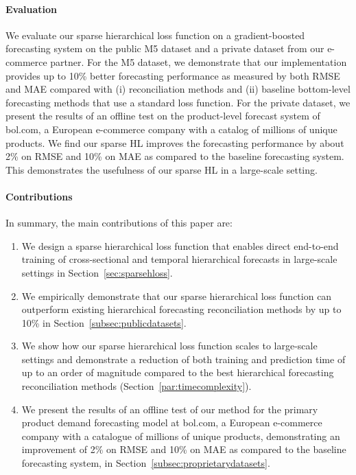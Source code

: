 \documentclass[preprint, 3p, times, twocolumn]{elsarticle}
\begin{document}
\paragraph{Evaluation} We evaluate our sparse hierarchical loss function on a gradient-boosted forecasting system on the public M5 dataset \cite{makridakis_m5_2022} and a private dataset from our e-commerce partner. For the M5 dataset, we demonstrate that our implementation provides up to 10\% better forecasting performance as measured by both RMSE and MAE compared with (i) reconciliation methods and (ii) baseline bottom-level forecasting methods that use a standard loss function. For the private dataset, we present the results of an offline test on the product-level forecast system of bol.com, a European e-commerce company with a catalog of millions of unique products. We find our sparse HL improves the forecasting performance by about 2\% on RMSE and 10\% on MAE as compared to the baseline forecasting system. This demonstrates the usefulness of our sparse HL in a large-scale setting.

\paragraph{Contributions} In summary, the main contributions of this paper are:
\begin{enumerate}
  \item We design a sparse hierarchical loss function that enables direct end-to-end training of cross-sectional and temporal hierarchical forecasts in large-scale settings in Section~\ref{sec:sparsehloss}.
  \item We empirically demonstrate that our sparse hierarchical loss function can outperform existing hierarchical forecasting reconciliation methods by up to 10\% in Section~\ref{subsec:publicdatasets}.
  \item We show how our sparse hierarchical loss function scales to large-scale settings and demonstrate a reduction of both training and prediction time of up to an order of magnitude compared to the best hierarchical forecasting reconciliation methods (Section~\ref{par:timecomplexity}).
  \item We present the results of an offline test of our method for the primary product demand forecasting model at bol.com, a European e-commerce company with a catalogue of millions of unique products, demonstrating an improvement of 2\% on RMSE and 10\% on MAE as compared to the baseline forecasting system, in Section~\ref{subsec:proprietarydatasets}.
\end{enumerate}
\end{document}
